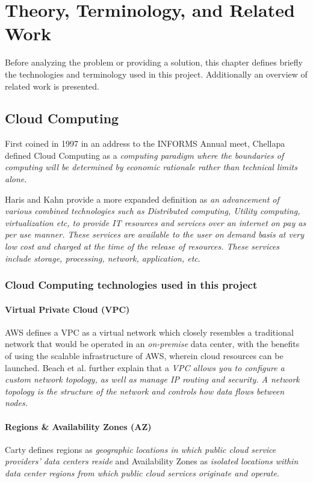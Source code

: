 \chapter{Theory, Terminology, and Related Work}
\label{sec:theory}
Before analyzing the problem or providing a solution,
this chapter defines briefly the technologies and terminology used in this project.
Additionally an overview of related work is presented.

\section{Cloud Computing}
First coined in 1997\cite{ray2018} in an address to the INFORMS Annual meet, 
Chellapa \cite{chellappa1997intermediaries} defined Cloud Computing as a
\emph{computing paradigm where the boundaries of computing will be determined by economic rationale rather than technical limits alone}. 

Haris and Kahn\cite{haris2018systematic} provide a more expanded definition as \emph{an advancement of various combined technologies such as 
Distributed computing, Utility computing, virtualization etc, to provide IT resources and services over an internet on pay as per use manner. 
These services are available to the user on demand basis at very low cost and charged at the time of the release of resources. 
These services include storage, processing, network, application, etc}. 

\subsection{Cloud Computing technologies used in this project}

\subsubsection{Virtual Private Cloud (VPC)}
AWS defines a VPC as a virtual network which closely resembles a traditional network that would be operated in an \emph{on-premise} data center, 
with the benefits of using the scalable infrastructure of AWS, wherein cloud resources can be launched.\cite{awsdocs_2022}
Beach et al. further explain that a \emph{VPC allows you to configure a custom network topology, as well as manage IP routing and security. 
A network topology is the structure of the network and controls how data flows between nodes.}\cite{Beach2019}

\subsubsection{Regions \& Availability Zones (AZ)}
Carty defines regions as \emph{geographic locations in which public cloud service providers' data centers reside} 
and Availability Zones as \emph{isolated locations within data center regions from which public cloud services originate and operate}.\cite{carty_2015}

